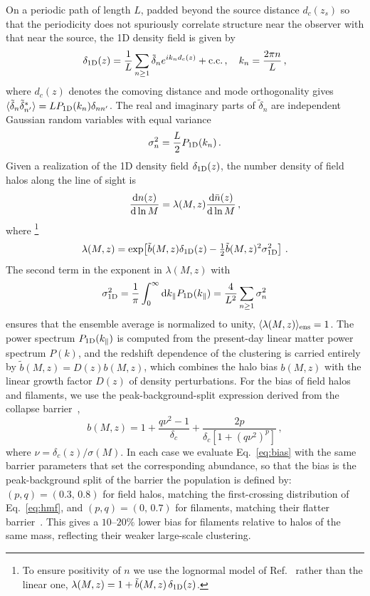 \documentclass[aps,prd,10pt,nofootinbib,twocolumn,superscriptaddress,floatfix,notitlepage]{revtex4-1}
\newcommand{\td}{{\rm d}}
\newcommand{\be}{\begin{equation}}
\newcommand{\ee}{\end{equation}}
\begin{document}
On a periodic path of length $L$, padded beyond the source distance $d_c(z_s)$ so that the periodicity does not spuriously correlate structure near the observer with that near the source, the 1D density field is given by
\be
    \delta_{\rm 1D}(z) = \frac{1}{L} \sum_{n\geq 1} \tilde\delta_n e^{i k_n d_c(z)} + {\rm c.c.} \,, \quad k_n= \frac{2\pi n}{L} \,,
\ee
where $d_c(z)$ denotes the comoving distance and mode orthogonality gives $\langle\tilde\delta_n\tilde\delta_{n'}^*\rangle=LP_{\rm 1D}(k_n)\delta_{nn'}$. The real and imaginary parts of  $\tilde\delta_n$ are independent Gaussian random variables with equal variance 
\be
    \sigma_n^2 = \frac{L}{2} P_{\rm 1D}(k_n) \,. 
\ee    
Given a realization of the 1D density field $\delta_{\rm 1D}(z)$, the number density of field halos along the line of sight is
\be \label{eq:n}
    \frac{\td n(z)}{\td \ln M} = \lambda(M,z) \frac{\td \bar{n}(z)}{\td \ln M} \,,
\ee
where \footnote{To ensure positivity of $n$ we use the lognormal model of Ref.~\cite{1991MNRAS.248....1C} rather than the linear one, $\lambda(M,z) = 1+\tilde{b}(M,z)\,\delta_{\rm 1D}(z)$.}
\be
    \lambda(M,z) = \exp\!\left[ \tilde{b}(M,z) \delta_{\rm 1D}(z) - \tfrac12 \tilde{b}(M,z)^2 \sigma_{\rm 1D}^2 \right] \,.
\ee
The second term in the exponent in $\lambda(M,z)$ with 
\be
    \sigma_{\rm 1D} ^ 2 = \frac{1}{\pi} \int_0 ^ \infty \td k_\parallel P_{\rm 1D}(k_\parallel) = \frac{4}{L^2} \sum_{n\geq 1} \sigma_n ^ 2
\ee
ensures that the ensemble average is normalized to unity, $\langle \lambda(M,z)\rangle_{\rm ens} = 1$. The power spectrum $P_{\rm 1D}(k_\parallel)$ is computed from the present-day linear matter power spectrum $P(k)$, and the redshift dependence of the clustering is carried entirely by $\tilde b(M,z) = D(z) b(M,z)$, which combines the halo bias $b(M,z)$ with the linear growth factor $D(z)$ of density perturbations.
For the bias of field halos and filaments, we use the peak-background-split expression derived from the collapse barrier~\cite{Sheth:1999mn},
\be \label{eq:bias}
    b(M,z) = 1 + \frac{q\nu^2 - 1}{\delta_c} + \frac{2p}{\delta_c\left[1+(q\nu^2)^p\right]} \,,
\ee
where $\nu = \delta_c(z)/\sigma(M)$. In each case we evaluate Eq.~\eqref{eq:bias} with the same barrier parameters that set the corresponding abundance, so that the bias is the peak-background split of the barrier the population is defined by: $(p,q) = (0.3,\,0.8)$ for field halos, matching the first-crossing distribution of Eq.~\eqref{eq:hmf}, and $(p,q) = (0,\,0.7)$ for filaments, matching their flatter barrier~\cite{Yan:2011ux}. This gives a $10\text{--}20\%$ lower bias for filaments relative to halos of the same mass, reflecting their weaker large-scale clustering.
\end{document}
